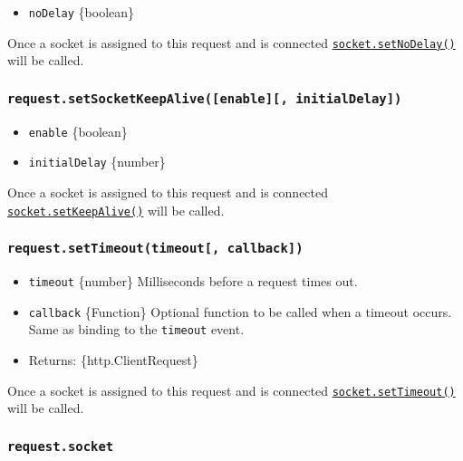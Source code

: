 \begin{itemize}
\tightlist
\item
  \texttt{noDelay} \{boolean\}
\end{itemize}

Once a socket is assigned to this request and is connected
\href{net.md\#socketsetnodelaynodelay}{\texttt{socket.setNoDelay()}}
will be called.

\subsubsection{\texorpdfstring{\texttt{request.setSocketKeepAlive({[}enable{]}{[},\ initialDelay{]})}}{request.setSocketKeepAlive({[}enable{]}{[}, initialDelay{]})}}\label{request.setsocketkeepaliveenable-initialdelay}

\begin{itemize}
\tightlist
\item
  \texttt{enable} \{boolean\}
\item
  \texttt{initialDelay} \{number\}
\end{itemize}

Once a socket is assigned to this request and is connected
\href{net.md\#socketsetkeepaliveenable-initialdelay}{\texttt{socket.setKeepAlive()}}
will be called.

\subsubsection{\texorpdfstring{\texttt{request.setTimeout(timeout{[},\ callback{]})}}{request.setTimeout(timeout{[}, callback{]})}}\label{request.settimeouttimeout-callback}

\begin{itemize}
\tightlist
\item
  \texttt{timeout} \{number\} Milliseconds before a request times out.
\item
  \texttt{callback} \{Function\} Optional function to be called when a
  timeout occurs. Same as binding to the
  \texttt{\textquotesingle{}timeout\textquotesingle{}} event.
\item
  Returns: \{http.ClientRequest\}
\end{itemize}

Once a socket is assigned to this request and is connected
\href{net.md\#socketsettimeouttimeout-callback}{\texttt{socket.setTimeout()}}
will be called.

\subsubsection{\texorpdfstring{\texttt{request.socket}}{request.socket}}\label{request.socket}

